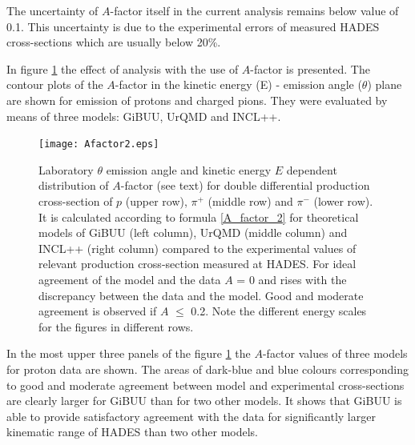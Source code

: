 The uncertainty of $A$-factor itself in the current analysis remains below value of 0.1.
This uncertainty is due to the experimental errors of measured HADES cross-sections which 
are usually below 20\%. 

In figure \ref{Afp_pip_pim_2D} the effect of analysis with the use of $A$-factor is presented.
The contour plots of the $A$-factor in the kinetic energy (E) - emission angle ($\theta$) plane are shown 
for emission of protons and charged pions.  They were evaluated by means of three models: GiBUU, UrQMD and INCL++.


\begin{figure}[!hbt]
\centering
\texttt{[image: Afactor2.eps]}%
\caption{\label{Afp_pip_pim_2D} Laboratory $\theta$ emission angle
and kinetic energy $E$ dependent distribution of $A$-factor (see text)
for double differential production cross-section of $p$ (upper row),
$\pi^{+}$ (middle row) and $\pi^{-}$ (lower row). It is calculated
according to formula \ref{A_factor_2} for theoretical models of GiBUU (left
column), UrQMD (middle column) and INCL++ (right column) compared to
the experimental values of relevant production cross-section
measured at HADES.
For ideal agreement of the model and the data $A$ = 0 and rises with
the discrepancy between the data and the model. Good and moderate
agreement is observed if $A$ $\le$ 0.2. Note the different energy
scales for the figures in different rows.}
\end{figure}


In the most upper three panels of the figure \ref{Afp_pip_pim_2D}
the $A$-factor values of three models for proton data are shown. 
The areas of dark-blue and blue colours corresponding to good 
and moderate agreement between model and
experimental cross-sections are clearly larger for GiBUU than
for two other models. 
It shows that GiBUU is able to provide satisfactory
agreement with the data for significantly larger  
kinematic range of HADES than two other models.  

